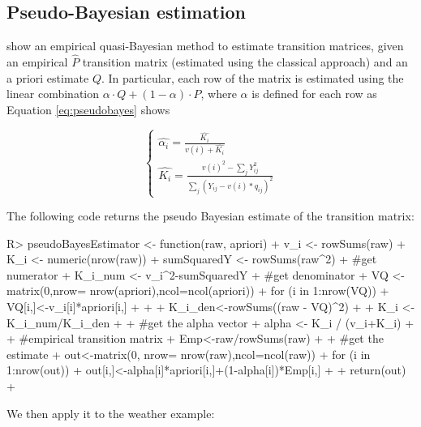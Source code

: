 \documentclass[
  nojss]{jss}
\begin{document}
\subsection{Pseudo-Bayesian estimation}\label{pseudo-bayesian-estimation}

\cite{Hu2002} show an empirical quasi-Bayesian method to estimate transition matrices, given an empirical \(\hat{P}\) transition matrix (estimated using the classical approach) and an a priori estimate \(Q\). In particular, each row of the matrix is estimated using the linear combination \(\alpha \cdot Q+\left(1-\alpha\right) \cdot P\), where \(\alpha\) is defined for each row as Equation \ref{eq:pseudobayes} shows

\begin{equation}
\left\{\begin{matrix}
\hat{\alpha_i}=\frac{\hat{K_i}}{v\left(i \right )+\hat{K_i}}\\ 
\hat{K_i}=\frac{v\left(i \right)^2 - \sum_{j}Y_{ij}^2}{\sum_{j}(Y_{ij}-v\left(i \right)*q_{ij})^2}
\end{matrix}\right.
\label{eq:pseudobayes}
\end{equation}

The following code returns the pseudo Bayesian estimate of the transition matrix:

\begin{CodeChunk}
\begin{CodeInput}
R> pseudoBayesEstimator <- function(raw, apriori){
+   v_i <- rowSums(raw) 
+   K_i <- numeric(nrow(raw))
+   sumSquaredY <- rowSums(raw^2)
+   #get numerator
+   K_i_num <- v_i^2-sumSquaredY
+   #get denominator
+   VQ <- matrix(0,nrow= nrow(apriori),ncol=ncol(apriori))
+   for (i in 1:nrow(VQ)) {
+     VQ[i,]<-v_i[i]*apriori[i,]
+   }
+   
+   K_i_den<-rowSums((raw - VQ)^2)
+   
+   K_i <- K_i_num/K_i_den
+   
+   #get the alpha vector
+   alpha <- K_i / (v_i+K_i)
+   
+   #empirical transition matrix
+   Emp<-raw/rowSums(raw)
+   
+   #get the estimate
+   out<-matrix(0, nrow= nrow(raw),ncol=ncol(raw))
+   for (i in 1:nrow(out)) {
+     out[i,]<-alpha[i]*apriori[i,]+(1-alpha[i])*Emp[i,]
+   }
+   return(out)
+ }
\end{CodeInput}
\end{CodeChunk}

We then apply it to the weather example:
\end{document}

